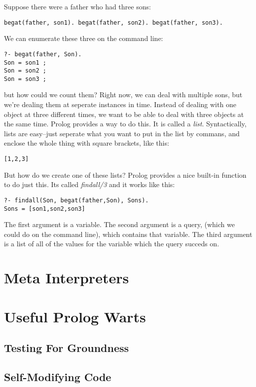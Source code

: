 \documentclass{book}[9pt]
\begin{document}
Suppose there were a father who had three sons:
\begin{verbatim}
begat(father, son1). begat(father, son2). begat(father, son3).
\end{verbatim}
\noindent We can enumerate these three on the command line:
\begin{verbatim}
?- begat(father, Son).
Son = son1 ;
Son = son2 ;
Son = son3 ;
\end{verbatim}
\noindent but how could we count them?  Right now, we can deal with
multiple sons, but we're dealing them at seperate instances in time.
Instead of dealing with one object at three different times, we want
to be able to deal with three objects at the same time.  Prolog
provides a way to do this.  It is called a {\em list}. Syntactically,
lists are easy--just seperate what you want to put in the list by
commans, and enclose the whole thing with square brackets, like this:
\begin{verbatim}
[1,2,3]
\end{verbatim}
\noindent  But how do we create one of these lists?  Prolog provides a nice
built-in function to do just this.  Its called {\em findall/3} and it works
like this:
\begin{verbatim}
?- findall(Son, begat(father,Son), Sons).
Sons = [son1,son2,son3]
\end{verbatim}

The first argument is a variable.  The second argument is a query,
(which we could do on the command line), which contains that variable.
The third argument is a list of all of the values for the variable
which the query succeds on.

\section{Meta Interpreters}

\section{Useful Prolog Warts}

\subsection{Testing For Groundness}

\subsection{Self-Modifying Code}
\end{document}
